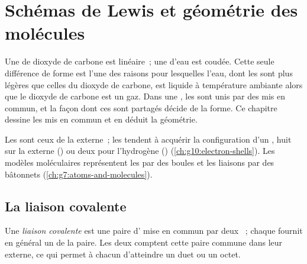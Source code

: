 \chapter{Schémas de Lewis et géométrie des molécules}\label{ch:g10:lewis-and-shape}

Une  de dioxyde de carbone est linéaire~; une  d'eau est
coudée. Cette seule différence de forme est l'une des raisons pour
lesquelles l'eau, dont les  sont plus légères que celles du
dioxyde de carbone, est liquide à température ambiante alors que le
dioxyde de carbone est un gaz. Dans une , les  sont unis
par des  mis en commun, et la façon dont ces  sont
partagés décide de la forme. Ce chapitre dessine les  mis en
commun et en déduit la géométrie.

\begin{recall}
Les  sont ceux de la  externe~; les 
tendent à acquérir la configuration d'un , huit  sur
la  externe () ou deux pour l'hydrogène () (\cref{ch:g10:electron-shells}). Les modèles moléculaires
représentent les  par des boules et les liaisons par des bâtonnets
(\cref{ch:g7:atoms-and-molecules}).
\end{recall}

\section{La liaison covalente}

\begin{definition}\label{def:g10:lewis-and-shape:covalent-bond}
Une \emph{liaison covalente} est une paire
d' mise en commun par deux ~; chaque  fournit en
général un  de la paire. Les deux  comptent cette paire
commune dans leur  externe, ce qui permet à chacun d'atteindre un
duet ou un octet.
\end{definition}

